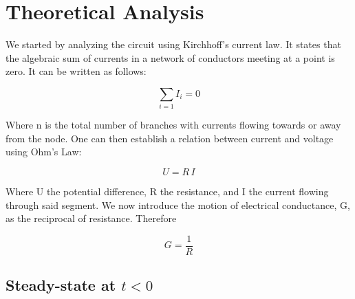 \section{Theoretical Analysis}
\label{sec:analysis}


We started by analyzing the circuit using Kirchhoff's current law. It states that the algebraic sum of currents in a network of conductors meeting at a point is zero. It can be written as follows:

\begin{center}
\begin{equation}
\sum_{i=1} I_i=0
\label{current law}
\end{equation}
\end{center}
Where n is the total number of branches with currents flowing towards or away from the node.
One can then establish a relation between current and voltage using Ohm's Law:

\begin{center}
\begin{equation}
U=R\,I
\label{current law}
\end{equation}
\end{center}
Where U the potential difference, R the resistance, and I the current flowing through said segment. We now introduce the motion of electrical conductance, G, as the reciprocal of resistance. Therefore

\begin{center}
\begin{equation}
G=\frac{1}{R}
\label{current law}
\end{equation}
\end{center}

\subsection{Steady-state at $t<0$}

